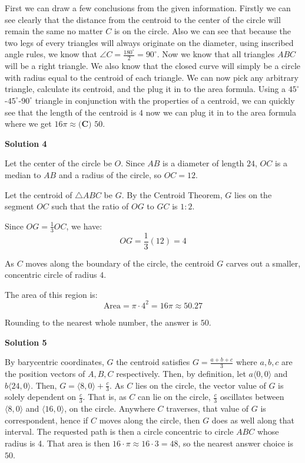 \begin{enumerate}
First we can draw a few conclusions from the given information. Firstly we can see clearly that the distance from the centroid to the center of the circle will remain the same no matter $C$ is on the circle. Also we can see that because the two legs of every triangles will always originate on the diameter, using inscribed angle rules, we know that $\angle C = \frac{180^\circ}{2} = 90^\circ$. Now we know that all triangles $ABC$ will be a right triangle. We also know that the closed curve will simply be a circle with radius equal to the centroid of each triangle. We can now pick any arbitrary triangle, calculate its centroid, and the plug it in to the area formula. Using a $45^\circ$-$45^\circ$-$90^\circ$ triangle in conjunction with the properties of a centroid, we can quickly see that the length of the centroid is $4$ now we can plug it in to the area formula where we get $16\pi\approx\boxed{\textbf{(C) } 50}$.

 


 



\textbf{Solution 4}

Let the center of the circle be $O$. Since $AB$ is a diameter of length $24$, $OC$ is a median to $AB$ and a radius of the circle, so $OC = 12$. 

 Let the centroid of $\triangle ABC$ be $G$. By the Centroid Theorem, $G$ lies on the segment $OC$ such that the ratio of $OG$ to $GC$ is $1:2$. 

 Since $OG = \frac{1}{3} OC$, we have:
 \[OG = \frac{1}{3}(12) = 4\]

 As $C$ moves along the boundary of the circle, the centroid $G$ carves out a smaller, concentric circle of radius $4$. 

 The area of this region is:
 \[\text{Area} = \pi \cdot 4^2 = 16\pi \approx 50.27\]

 Rounding to the nearest whole number, the answer is $\boxed{50}$.

 



\textbf{Solution 5}

By barycentric coordinates, $G$ the centroid satisfies $G = \frac{a+b+c}{3}$ where $a,b,c$ are the position vectors of $A,B,C$ respectively. Then, by definition, let $a \langle 0,0 \rangle$ and $b \langle 24, 0 \rangle$. Then, $G = \langle 8,0 \rangle + \frac{c}{3}$. As $C$ lies on the circle, the vector value of $G$ is solely dependent on $\frac{c}{3}$. That is, as $C$ can lie on the circle, $\frac{c}{3}$ oscillates between $\langle 8,0 \rangle$ and $\langle 16,0 \rangle$, on the circle. Anywhere $C$ traverses, that value of $G$ is correspondent, hence if $C$ moves along the circle, then $G$ does as well along that interval. The requested path is then a circle concentric to circle $ABC$ whose radius is 4. That area is then $16 \cdot \pi \approx 16 \cdot 3 = 48$, so the nearest answer choice is $\boxed{50}$.


\end{enumerate}
